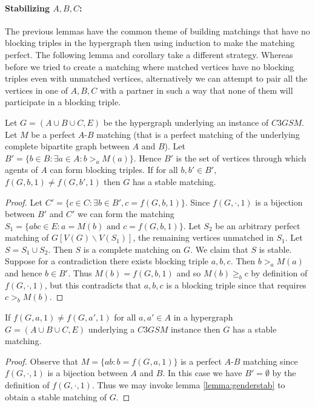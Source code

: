 \paragraph{Stabilizing $A,B,C$:}
The previous lemmas have the common theme of building matchings that have no blocking triples in the hypergraph then using induction to make the matching perfect. The following lemma and corollary take a different strategy. Whereas before we tried to create a matching where matched vertices have no blocking triples even with unmatched vertices, alternatively we can attempt to pair all the vertices in one of $A,B,C$ with a partner in such a way that none of them will participate in a blocking triple.
\begin{lemma}\label{lemma:genderstab}
Let $G=(A\cup B\cup C, E)$ be the hypergraph underlying an instance of $C3GSM$. Let $M$ be a perfect $A$-$B$ matching (that is a perfect matching of the underlying complete bipartite graph between $A$ and $B$). Let $B' = \{ b \in B : \exists a \in A : b >_a M(a) \}$. Hence $B'$ is the set of vertices through which agents of $A$ can form blocking triples. If for all $b, b' \in B'$, $f(G,b,1) \neq f(G,b',1)$ then $G$ has a stable matching.
\end{lemma}
\begin{proof}
Let $C' = \{ c \in C : \exists b\in B', c = f(G,b,1)\}$. Since $f(G,\cdot,1)$ is a bijection between $B'$ and $C'$ we can form the matching $S_1 = \{abc \in E: a = M(b)\text{ and } c = f(G,b,1)\}$. Let $S_2$ be an arbitrary perfect matching of $G[V(G) \backslash V(S_1)]$, the remaining vertices unmatched in $S_1$. Let $S = S_1 \cup S_2$. Then $S$ is a complete matching on $G$. We claim that $S$ is stable. Suppose for a contradiction there exists blocking triple $a,b,c$. Then $b >_a M(a)$ and hence $b \in B'$. Thus $M(b) = f(G,b,1)$ and so $M(b) \geq_b c$ by definition of $f(G,\cdot,1)$, but this contradicts that $a,b,c$ is a blocking triple since that requires $c >_b M(b)$.
\end{proof}
\begin{corollary}
If $f(G,a,1) \neq f(G,a',1)$ for all $a,a' \in A$ in a hypergraph $G=(A\cup B \cup C, E)$ underlying a $C3GSM$ instance then $G$ has a stable matching.
\end{corollary}
\begin{proof}
Observe that $M = \{ab : b = f(G,a,1)\}$ is a perfect $A$-$B$ matching since $f(G,\cdot, 1)$ is a bijection between $A$ and $B$. In this case we have $B' = \emptyset$ by the definition of $f(G,\cdot,1)$. Thus we may invoke lemma \ref{lemma:genderstab} to obtain a stable matching of $G$.
\end{proof}
